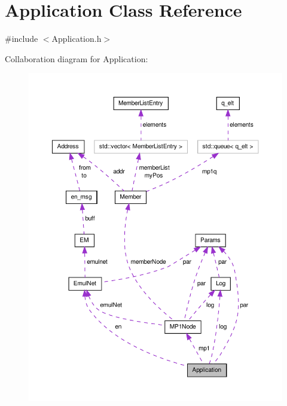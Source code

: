 \hypertarget{class_application}{\section{\-Application \-Class \-Reference}
\label{de/d6b/class_application}
}


{\ttfamily \#include $<$\-Application.\-h$>$}



\-Collaboration diagram for \-Application\-:
\nopagebreak
\begin{figure}[H]
\begin{center}
\leavevmode
\includegraphics[width=350pt]{d2/d07/class_application__coll__graph}
\end{center}
\end{figure}
